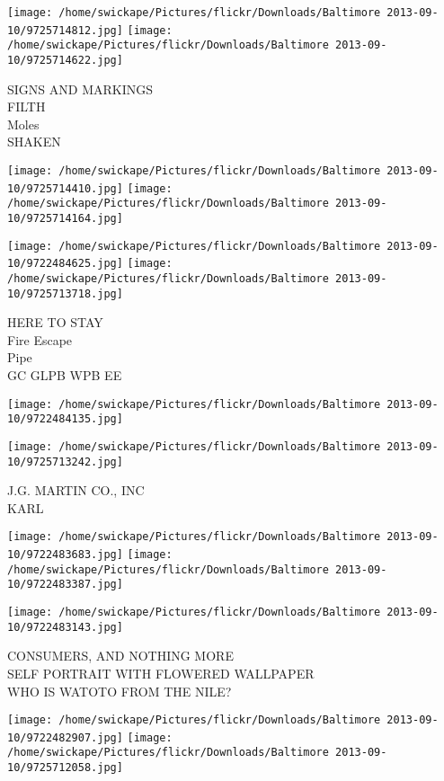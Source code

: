 \documentclass[10pt,letterpaper]{article}
\begin{document}
\texttt{[image: /home/swickape/Pictures/flickr/Downloads/Baltimore 2013-09-10/9725714812.jpg]}
\texttt{[image: /home/swickape/Pictures/flickr/Downloads/Baltimore 2013-09-10/9725714622.jpg]}

SIGNS AND MARKINGS\\
FILTH\\
Moles\\
SHAKEN\\
\pagebreak

\texttt{[image: /home/swickape/Pictures/flickr/Downloads/Baltimore 2013-09-10/9725714410.jpg]}
\texttt{[image: /home/swickape/Pictures/flickr/Downloads/Baltimore 2013-09-10/9725714164.jpg]}

\texttt{[image: /home/swickape/Pictures/flickr/Downloads/Baltimore 2013-09-10/9722484625.jpg]}
\texttt{[image: /home/swickape/Pictures/flickr/Downloads/Baltimore 2013-09-10/9725713718.jpg]}

HERE TO STAY\\
Fire Escape\\
Pipe\\
GC GLPB WPB EE\\
\pagebreak

\texttt{[image: /home/swickape/Pictures/flickr/Downloads/Baltimore 2013-09-10/9722484135.jpg]}

\vspace{0.25in}
\texttt{[image: /home/swickape/Pictures/flickr/Downloads/Baltimore 2013-09-10/9725713242.jpg]}

J.G. MARTIN CO., INC\\
KARL\\
\pagebreak

\texttt{[image: /home/swickape/Pictures/flickr/Downloads/Baltimore 2013-09-10/9722483683.jpg]}
\texttt{[image: /home/swickape/Pictures/flickr/Downloads/Baltimore 2013-09-10/9722483387.jpg]}

\vspace{0.25in}
\texttt{[image: /home/swickape/Pictures/flickr/Downloads/Baltimore 2013-09-10/9722483143.jpg]}

CONSUMERS, AND NOTHING MORE\\
SELF PORTRAIT WITH FLOWERED WALLPAPER\\
WHO IS WATOTO FROM THE NILE?\\
\pagebreak

\texttt{[image: /home/swickape/Pictures/flickr/Downloads/Baltimore 2013-09-10/9722482907.jpg]}
\texttt{[image: /home/swickape/Pictures/flickr/Downloads/Baltimore 2013-09-10/9725712058.jpg]}
\end{document}
